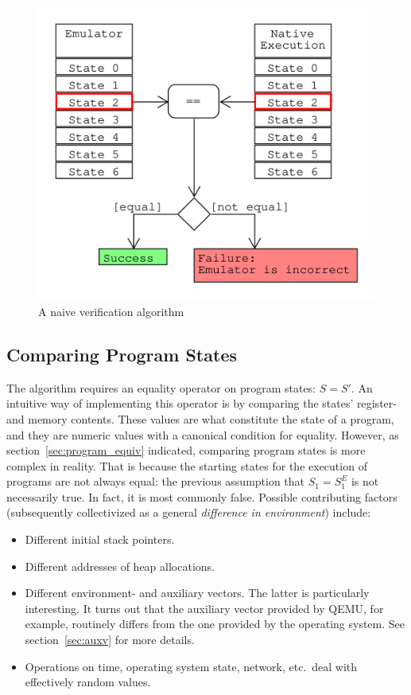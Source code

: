 \begin{figure}[htpb]
    \centering
    \includegraphics[width=0.6\linewidth]{figures/naive_algo.png}
    \caption{A naive verification algorithm}\label{fig:naive_algo}
\end{figure}

\subsection{Comparing Program States}\label{sec:comparison}

The algorithm requires an equality operator on program states: $S = S'$. An intuitive way of implementing this operator
is by comparing the states' register- and memory contents. These values are what constitute the state of a program, and
they are numeric values with a canonical condition for equality. However, as section~\ref{sec:program_equiv} indicated,
comparing program states is more complex in reality. That is because the starting states for the execution of programs
are not always equal: the previous assumption that $S_1 = S^E_1$ is not necessarily true. In fact, it is most commonly
false.  Possible contributing factors (subsequently collectivized as a general \textit{difference in environment})
include:

\begin{itemize}
    \item Different initial stack pointers.
    \item Different addresses of heap allocations.
    \item Different environment- and auxiliary vectors. The latter is particularly interesting. It turns out that
        the auxiliary vector provided by QEMU, for example, routinely differs from the one provided by the operating
        system. See section~\ref{sec:auxv} for more details.
    \item Operations on time, operating system state, network, etc.\ deal with effectively random values.
\end{itemize}

